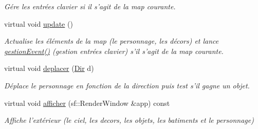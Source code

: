 \begin{DoxyCompactItemize}
\begin{DoxyCompactList}\small\item\em Gére les entrées clavier si il s'agit de la map courante. \end{DoxyCompactList}\item 
\hypertarget{classExterieur_af79fb987ffc8c8a5ec73086929eb2f69}{virtual void \hyperlink{classExterieur_af79fb987ffc8c8a5ec73086929eb2f69}{update} ()}\label{classExterieur_af79fb987ffc8c8a5ec73086929eb2f69}

\begin{DoxyCompactList}\small\item\em Actualise les éléments de la map (le personnage, les décors) et lance \hyperlink{classExterieur_ae412ede4d4f1e3bcbb50100c20ad8225}{gestion\-Event()} (gestion entrées clavier) s'il s'agit de la map courante. \end{DoxyCompactList}\item 
virtual void \hyperlink{classExterieur_a531b6ba1b46d2da431fd10911c54c49c}{deplacer} (\hyperlink{Espace_8h_a7cf6e8c5a5bc5e7b2afef3647870b1c4}{Dir} d)
\begin{DoxyCompactList}\small\item\em Déplace le personnage en fonction de la direction puis test s'il gagne un objet. \end{DoxyCompactList}\item 
virtual void \hyperlink{classExterieur_ac06a6939f2998926160d4ccf11cc8498}{afficher} (sf\-::\-Render\-Window \&app) const 
\begin{DoxyCompactList}\small\item\em Affiche l'extérieur (le ciel, les decors, les objets, les batiments et le personnage) \end{DoxyCompactList}\end{DoxyCompactItemize}
